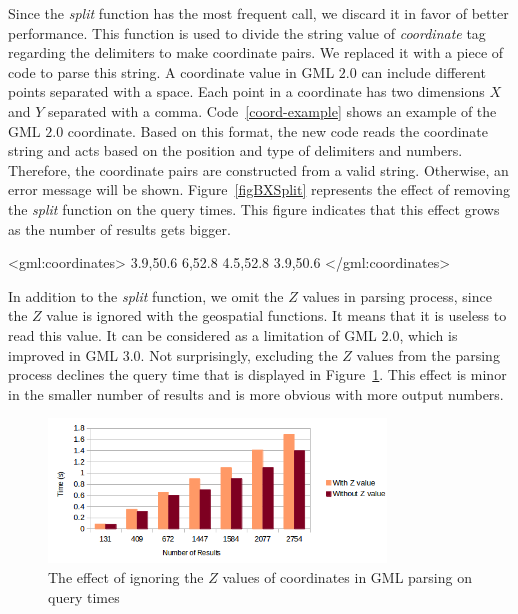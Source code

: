 \documentclass[a4paper,12pt]{article}
\begin{document}
Since the \textit{split} function has the most frequent call, we discard it in favor of better performance. This function is used to divide the string value of \textit{coordinate} tag regarding the delimiters to make coordinate pairs. We replaced it with a piece of code to parse this string. 
A coordinate value in GML $2.0$ can include different points separated with a space. Each point in a coordinate has two dimensions $X$ and $Y$ separated with a comma. Code~\ref{coord-example} shows an example of the GML $2.0$ coordinate. Based on this format, the new code reads the coordinate string and acts based on the position and type of delimiters and numbers. Therefore, the coordinate pairs are constructed from a valid string. Otherwise, an error message will be shown. Figure~\ref{figBXSplit} represents the effect of removing the \textit{split} function on the query times. This figure indicates that this effect grows as the number of results gets bigger.
 
\vspace{10px}
\begin{fakeXML}[label=coord-example,caption=An example of GML 2.0 coordinate]
<gml:coordinates>
  3.9,50.6 6,52.8 4.5,52.8 3.9,50.6
</gml:coordinates>
\end{fakeXML}
\vspace{10px}

In addition to the \textit{split} function, we omit the $Z$ values in parsing process, since the $Z$ value is ignored with the geospatial functions. It means that it is useless to read this value. It can be considered as a limitation of GML $2.0$, which is improved in GML $3.0$. Not surprisingly, excluding the $Z$ values from the parsing process declines the query time that is displayed in Figure~\ref{figBXZvalue}. This effect is minor in the smaller number of results and is more obvious with more output numbers.

\begin{figure}
\centering
\includegraphics[width=0.8\textwidth,height=0.2\textheight]{BXZvalue-sec}
\caption{The effect of ignoring the $Z$ values of coordinates in GML parsing on query times}
\label{figBXZvalue}
\end{figure}
\end{document}
